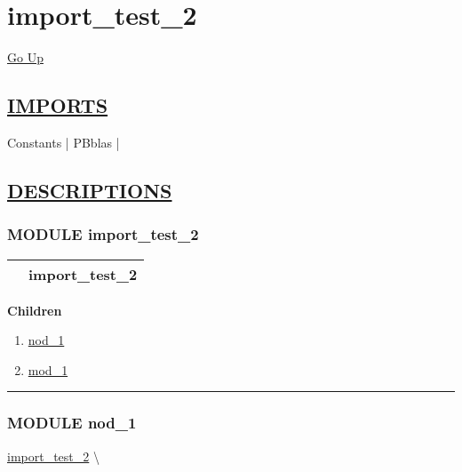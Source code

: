 \chapter*{\color{headfile}
import_test_2
}
\hypertarget{ecldoc:toc:import_test_2}{}
\hyperlink{ecldoc:toc:root}{Go Up}

\section*{\underline{\textsf{IMPORTS}}}
\begin{doublespace}
{\large
Constants |
PBblas |
}
\end{doublespace}

\section*{\underline{\textsf{DESCRIPTIONS}}}
\subsection*{\textsf{\colorbox{headtoc}{\color{white} MODULE}
import\_test\_2}}

\hypertarget{ecldoc:import_test_2}{}

{\renewcommand{\arraystretch}{1.5}
\begin{tabularx}{\textwidth}{|>{\raggedright\arraybackslash}l|X|}
\hline
\hspace{0pt}\mytexttt{\color{red} } & \textbf{import\_test\_2} \\
\hline
\end{tabularx}
}

\par


\textbf{Children}
\begin{enumerate}
\item \hyperlink{ecldoc:Constants}{nod\_1}
\item \hyperlink{ecldoc:PBblas}{mod\_1}
\end{enumerate}

\rule{\linewidth}{0.5pt}

\subsection*{\textsf{\colorbox{headtoc}{\color{white} MODULE}
nod\_1}}

\hypertarget{ecldoc:Constants}{}
\hspace{0pt} \hyperlink{ecldoc:import_test_2}{import_test_2} \textbackslash 

